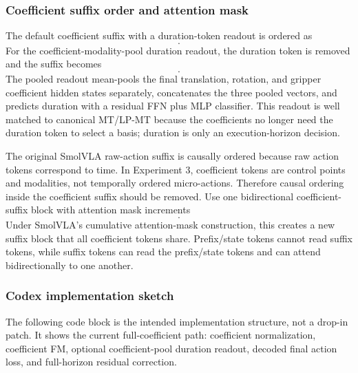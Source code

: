 \documentclass[10pt,twocolumn,letterpaper]{article}
\begin{document}
\subsubsection*{Coefficient suffix order and attention mask}
The default coefficient suffix with a duration-token readout is ordered as
\begin{equation}
[\texttt{duration}]
[\texttt{translation\ coeffs}]
[\texttt{rotation\ coeffs}]
[\texttt{gripper\ coeffs}].
\end{equation}
For the coefficient-modality-pool duration readout, the duration token is removed and the suffix becomes
\begin{equation}
[\texttt{translation\ coeffs}]
[\texttt{rotation\ coeffs}]
[\texttt{gripper\ coeffs}].
\end{equation}
The pooled readout mean-pools the final translation, rotation, and gripper coefficient hidden states separately, concatenates the three pooled vectors, and predicts duration with a residual FFN plus MLP classifier. This readout is well matched to canonical MT/LP-MT because the coefficients no longer need the duration token to select a basis; duration is only an execution-horizon decision.

The original SmolVLA raw-action suffix is causally ordered because raw action tokens correspond to time. In Experiment 3, coefficient tokens are control points and modalities, not temporally ordered micro-actions. Therefore causal ordering inside the coefficient suffix should be removed. Use one bidirectional coefficient-suffix block with attention mask increments
\begin{equation}
[1,0,0,\ldots,0].
\end{equation}
Under SmolVLA's cumulative attention-mask construction, this creates a new suffix block that all coefficient tokens share. Prefix/state tokens cannot read suffix tokens, while suffix tokens can read the prefix/state tokens and can attend bidirectionally to one another.


\subsubsection*{Codex implementation sketch}
The following code block is the intended implementation structure, not a drop-in patch. It shows the current full-coefficient path: coefficient normalization, coefficient FM, optional coefficient-pool duration readout, decoded final action loss, and full-horizon residual correction.
\end{document}
